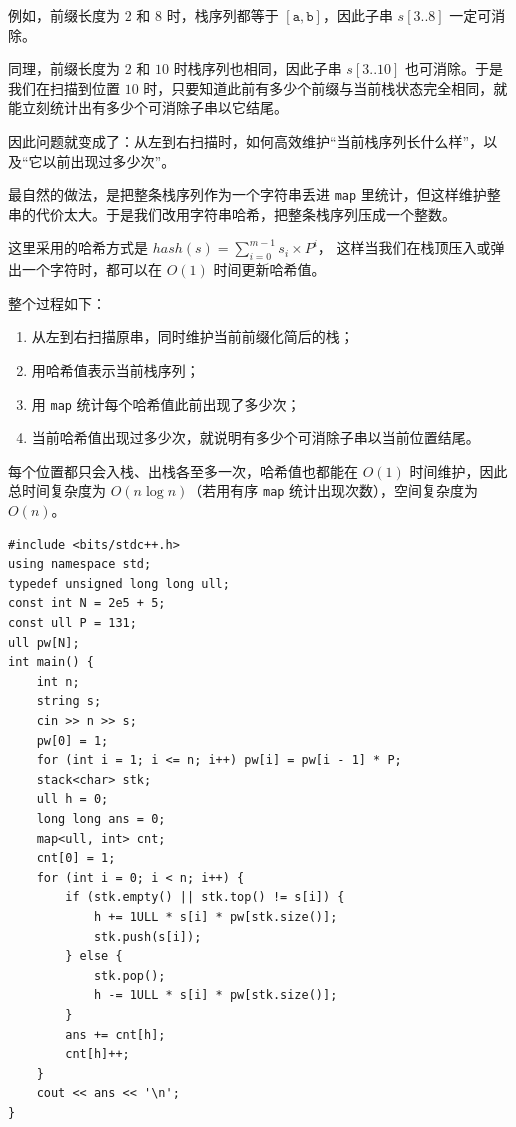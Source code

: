 \documentclass{book}
\newcommand{\code}[1]{\colorbox{codebg}{\texttt{#1}}}  %
\begin{document}
    例如，前缀长度为 $2$ 和 $8$ 时，栈序列都等于 $[\texttt{a},\texttt{b}]$，因此子串 $s[3..8]$ 一定可消除。

    同理，前缀长度为 $2$ 和 $10$ 时栈序列也相同，因此子串 $s[3..10]$ 也可消除。于是我们在扫描到位置 $10$ 时，只要知道此前有多少个前缀与当前栈状态完全相同，就能立刻统计出有多少个可消除子串以它结尾。

    因此问题就变成了：从左到右扫描时，如何高效维护“当前栈序列长什么样”，以及“它以前出现过多少次”。

    最自然的做法，是把整条栈序列作为一个字符串丢进 \code{map} 里统计，但这样维护整串的代价太大。于是我们改用字符串哈希，把整条栈序列压成一个整数。

    这里采用的哈希方式是
    $hash(s)=\sum\limits_{i=0}^{m-1} s_i \times P^i$，
    这样当我们在栈顶压入或弹出一个字符时，都可以在 $O(1)$ 时间更新哈希值。

    整个过程如下：

    \begin{enumerate}[leftmargin=2em,itemsep=1pt,topsep=2pt,parsep=0pt,partopsep=0pt]
        \item 从左到右扫描原串，同时维护当前前缀化简后的栈；
        \item 用哈希值表示当前栈序列；
        \item 用 \code{map} 统计每个哈希值此前出现了多少次；
        \item 当前哈希值出现过多少次，就说明有多少个可消除子串以当前位置结尾。
    \end{enumerate}

    每个位置都只会入栈、出栈各至多一次，哈希值也都能在 $O(1)$ 时间维护，因此总时间复杂度为 $O(n \log n)$（若用有序 \code{map} 统计出现次数），空间复杂度为 $O(n)$。

    \begin{lstlisting}[style = code]
#include <bits/stdc++.h>
using namespace std;
typedef unsigned long long ull;
const int N = 2e5 + 5;
const ull P = 131;
ull pw[N];
int main() {
    int n;
    string s;
    cin >> n >> s;
    pw[0] = 1;
    for (int i = 1; i <= n; i++) pw[i] = pw[i - 1] * P;
    stack<char> stk;
    ull h = 0;
    long long ans = 0;
    map<ull, int> cnt;
    cnt[0] = 1;
    for (int i = 0; i < n; i++) {
        if (stk.empty() || stk.top() != s[i]) {
            h += 1ULL * s[i] * pw[stk.size()];
            stk.push(s[i]);
        } else {
            stk.pop();
            h -= 1ULL * s[i] * pw[stk.size()];
        }
        ans += cnt[h];
        cnt[h]++;
    }
    cout << ans << '\n';
}
    \end{lstlisting}
\newpage
\end{document}

